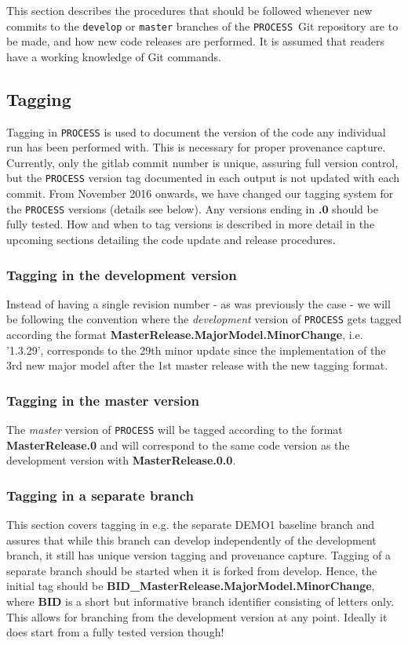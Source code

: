 \documentclass[11pt,a4paper]{report}
\newcommand{\process}{\mbox{\texttt{PROCESS}}}
\begin{document}
This section describes the procedures that should be followed whenever new
commits to the \texttt{develop} or \texttt{master} branches of the \process\
Git repository are to be made, and how new code releases are performed. It is
assumed that readers have a working knowledge of Git commands.


\subsection{Tagging}
\label{sec:tagging}
Tagging in \process\/ is used to document the version of the code any individual
run has been performed with. This is necessary for proper provenance capture.
Currently, only the gitlab commit number is unique, assuring full version control,
but the \process\/ version tag documented in each output is not updated with
each commit. From November 2016 onwards, we have changed our tagging system for
the \process\/ versions (details see below). Any versions ending in {\bf .0} should
be fully tested. How and when to tag versions is described in more detail in the
upcoming sections detailing the code update and release procedures.

\subsubsection{Tagging in the development version}
Instead of having a single revision number - as was previously the case - we will be following the convention where the {\it development} version of \process\/ gets tagged according the format {\bf MasterRelease.MajorModel.MinorChange}, i.e. '1.3.29', corresponds to the 29th minor update since the implementation of the 3rd new major model after the 1st master release with the new tagging format.

\subsubsection{Tagging in the master version}
The {\it master} version of \process\/ will be tagged according to the format {\bf MasterRelease.0} and will correspond to the same code version as the development version with {\bf MasterRelease.0.0}.

\subsubsection{Tagging in a separate branch}
This section covers tagging in e.g. the separate DEMO1 baseline branch and assures that while this branch can develop independently of the development branch, it still has unique version tagging and provenance capture. Tagging of a separate branch should be started when it is forked from develop. Hence, the initial tag should be {\bf BID\_MasterRelease.MajorModel.MinorChange}, where {\bf BID} is a short but informative branch identifier consisting of letters only. This allows for branching from the development version at any point. Ideally it does start from a fully tested version though! 
\end{document}
